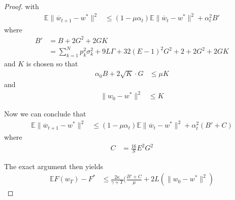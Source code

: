 \begin{proof}
	with 
	\begin{align*}
	\mathbb{E}\|\overline{w}_{t+1}-w^{\ast}\|^{2} & \leq(1-\mu\alpha_{t})\mathbb{E}\|\overline{w}_{t}-w^{\ast}\|^{2}+\alpha_{t}^{2}B'
	\end{align*}
	where 
	\begin{align*}
	B' & =B+2G^{2}+2GK\\
	& =\sum_{k=1}^{N}p_{k}^{2}\sigma_{k}^{2}+9L\Gamma+32(E-1)^{2}G^{2}+2+2G^{2}+2GK
	\end{align*}
	and $K$ is chosen so that 
	\begin{align*}
	\alpha_{0}B+2\sqrt{K}\cdot G & \leq\mu K
	\end{align*}
	and
	\begin{align*}
	\|w_{0}-w^{\ast}\|^{2} & \leq K
	\end{align*}
	
	Now we can conclude that 
	\begin{align*}
	\mathbb{E}\|\overline{w}_{t+1}-w^{\ast}\|^{2} & \leq(1-\mu\alpha_{t})\mathbb{E}\|\overline{w}_{t}-w^{\ast}\|^{2}+\alpha_{t}^{2}(B'+C)
	\end{align*}
	where 
	\begin{align*}
	C & =\frac{16}{S}E^{2}G^{2}
	\end{align*}
	
	The exact argument then yields 
	\begin{align*}
	\mathbb{E}F(w_{T})-F^{\ast} & \leq\frac{2\kappa}{\gamma+T}(\frac{B'+C}{\mu}+2L(\|w_{0}-w^{\ast}\|^{2})
	\end{align*}
\end{proof}